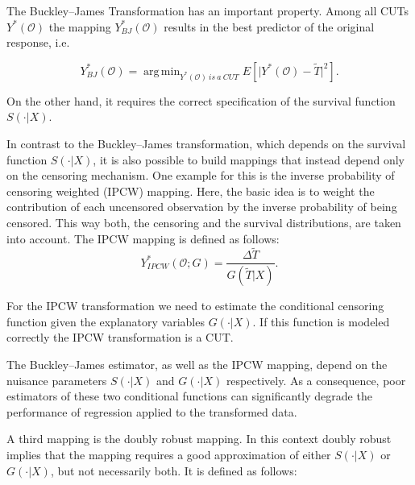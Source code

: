 \documentclass[12pt, a4paper]{scrartcl}
\theoremstyle{definition}
\theoremstyle{plain}
\numberwithin{equation}{section}
\numberwithin{figure}{section}
\numberwithin{table}{section}
\DeclareMathOperator*{\argmin}{arg\,min}
\begin{document}
	The Buckley--James Transformation has an important property.
	Among all CUTs $Y^*(\mathcal{O})$ the mapping $Y_{BJ}^* (\mathcal{O})$ results in the best predictor of the original response, i.e.
	
	\begin{equation*}
	Y_{BJ}^* (\mathcal{O})= \argmin_{Y^*(\mathcal{O})~is~a~CUT} E[ \vert Y^*(\mathcal{O}) - \tilde T \vert ^2].
	\end{equation*}
	
	On the other hand, it requires the correct specification of the survival function $S(\cdot\vert X)$.

	In contrast to the Buckley--James transformation, which depends on the survival function $S(\cdot\vert X)$, it is also possible to build mappings that instead depend only on the censoring mechanism.
	One example for this is the inverse probability of censoring weighted (IPCW) mapping.
	Here, the basic idea is to weight the contribution of each uncensored observation by the inverse probability of being censored.
	This way both, the censoring and the survival distributions, are taken into account.
	The IPCW mapping is defined as follows:
	\begin{equation*}
	Y_{IPCW}^*(\mathcal{O}; G) = \frac{\Delta \tilde T}{G(\tilde T \vert X)}.
	\end{equation*}

	For the IPCW transformation we need to estimate the conditional censoring function given the explanatory variables $G(\cdot\vert X)$.
	If this function is modeled correctly the IPCW transformation is a CUT.
	
	
	

	The Buckley--James estimator, as well as the IPCW mapping, depend on the nuisance parameters $S(\cdot\vert X)$ and $G(\cdot\vert X)$ respectively.
	As a consequence, poor estimators of these two conditional functions can significantly degrade the performance of regression applied to the transformed data.
	
	A third mapping is the doubly robust mapping.
	In this context doubly robust implies that the mapping requires a good approximation of either  $S(\cdot\vert X)$ or $G(\cdot\vert X)$, but not necessarily both.
	It is defined as follows:
	
\end{document}
